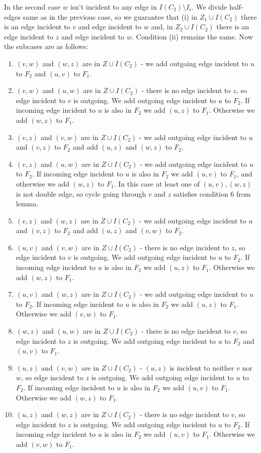 \documentclass[a4, 11pt]{article}
\newcommand{\<}{\langle}
\renewcommand{\>}{\rangle}
\begin{document}
In the second case $w$ isn't incident to any edge in $I(C_2) \setminus I_c$. We divide half-edges same as in the previous case, so we guarantee that (i) in $Z_1 \cup I(C_2)$ there is an edge incident to $v$ and edge incident to $w$ and, in $Z_2 \cup I(C_2)$ there is an edge incident to $z$ and edge incident to $w$. Condition (ii) remains the same. Now the subcases are as follows:
\begin{enumerate}
	\item $(v,w)$ and $(w,z)$ are in $Z \cup I(C_2)$ - we add outgoing edge incident to $u$ to $F_2$ and $(u,v)$ to $F_1$.
	\item $(v,w)$ and $(u,w)$ are in $Z \cup I(C_2)$ - there is no edge incident to $z$, so edge incident to $v$ is outgoing. We add outgoing edge incident to $u$ to $F_2$. If incoming edge incident to $u$ is also in $F_2$ we add $(u,z)$ to $F_1$. Otherwise we add $(w,z)$ to $F_1$.
	\item $(v,z)$ and $(v,w)$ are in $Z \cup I(C_2)$ - we add outgoing edge incident to $u$ and $(v,z)$ to $F_2$ and add $(u,z)$ and $(w,z)$ to $F_2$.
	\item $(v,z)$ and $(u,w)$ are in $Z \cup I(C_2)$ - we add outgoing edge incident to $u$ to $F_2$. If incoming edge incident to $u$ is also in $F_2$ we add $(u,v)$ to $F_1$, and otherwise we add $(w,z)$ to $F_1$. In this case at least one of $(u,v), (w,z)$ is not double edge, so cycle going through $v$ and $z$ satisfies condition 6 from lemma.
	\item $(v,z)$ and $(w,z)$ are in $Z \cup I(C_2)$ - we add outgoing edge incident to $u$ and $(v,z)$ to $F_2$ and add $(u,z)$ and $(v,w)$ to $F_2$.
	\item $(u,v)$ and $(v,w)$ are in $Z \cup I(C_2)$ - there is no edge incident to $z$, so edge incident to $v$ is outgoing. We add outgoing edge incident to $u$ to $F_2$. If incoming edge incident to $u$ is also in $F_2$ we add $(u,z)$ to $F_1$. Otherwise we add $(w,z)$ to $F_1$.
	\item $(u,v)$ and $(w,z)$ are in $Z \cup I(C_2)$ - we add outgoing edge incident to $u$ to $F_2$. If incoming edge incident to $u$ is also in $F_2$ we add $(u,z)$ to $F_1$. Otherwise we add $(v,w)$ to $F_1$.
	\item $(w,z)$ and $(u,w)$ are in $Z \cup I(C_2)$ - there is no edge incident to $v$, so edge incident to $z$ is outgoing. We add outgoing edge incident to $u$ to $F_2$ and $(u,v)$ to $F_1$.
	\item $(u,z)$ and $(v,w)$ are in $Z \cup I(C_2)$ - $(u,z)$ is incident to neither $v$ nor $w$, so edge incident to $z$ is outgoing. We add outgoing edge incident to $u$ to $F_2$. If incoming edge incident to $u$ is also in $F_2$ we add $(u,v)$ to $F_1$. Otherwise we add $(w,z)$ to $F_1$.
	\item $(u,z)$ and $(w,z)$ are in $Z \cup I(C_2)$ - there is no edge incident to $v$, so edge incident to $z$ is outgoing. We add outgoing edge incident to $u$ to $F_2$. If incoming edge incident to $u$ is also in $F_2$ we add $(u,v)$ to $F_1$. Otherwise we add $(v,w)$ to $F_1$.
\end{enumerate}
\end{document}
